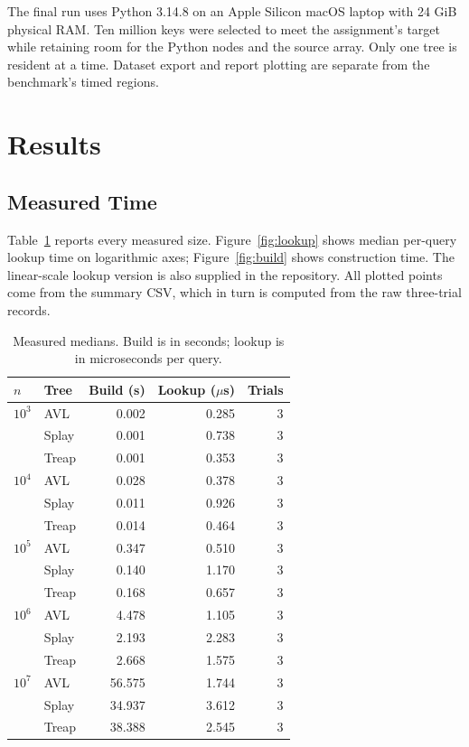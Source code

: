 \documentclass[acmsmall,nonacm]{acmart}
\begin{document}
The final run uses Python 3.14.8 on an Apple Silicon macOS laptop with 24 GiB physical RAM. Ten million keys were selected to meet the assignment's target while retaining room for the Python nodes and the source array. Only one tree is resident at a time. Dataset export and report plotting are separate from the benchmark's timed regions.

\section{Results}
\subsection{Measured Time}
Table~\ref{tab:results} reports every measured size. Figure~\ref{fig:lookup} shows median per-query lookup time on logarithmic axes; Figure~\ref{fig:build} shows construction time. The linear-scale lookup version is also supplied in the repository. All plotted points come from the summary CSV, which in turn is computed from the raw three-trial records.

\begin{table}[t]
\caption{Measured medians. Build is in seconds; lookup is in microseconds per query.}
\label{tab:results}
\centering\small
\begin{tabular}{@{}llrrr@{}}
\toprule
$n$ & Tree & Build (s) & Lookup ($\mu$s) & Trials \\
\midrule
$10^3$ & AVL & 0.002 & 0.285 & 3 \\
 & Splay & 0.001 & 0.738 & 3 \\
 & Treap & 0.001 & 0.353 & 3 \\
\midrule
$10^4$ & AVL & 0.028 & 0.378 & 3 \\
 & Splay & 0.011 & 0.926 & 3 \\
 & Treap & 0.014 & 0.464 & 3 \\
\midrule
$10^5$ & AVL & 0.347 & 0.510 & 3 \\
 & Splay & 0.140 & 1.170 & 3 \\
 & Treap & 0.168 & 0.657 & 3 \\
\midrule
$10^6$ & AVL & 4.478 & 1.105 & 3 \\
 & Splay & 2.193 & 2.283 & 3 \\
 & Treap & 2.668 & 1.575 & 3 \\
\midrule
$10^7$ & AVL & 56.575 & 1.744 & 3 \\
 & Splay & 34.937 & 3.612 & 3 \\
 & Treap & 38.388 & 2.545 & 3 \\
\bottomrule
\end{tabular}
\end{table}
\end{document}
